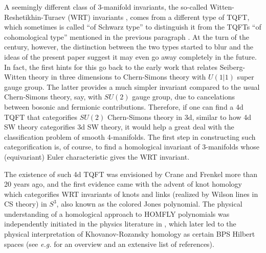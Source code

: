 \documentclass[hyper,letterpaper]{JHEP3}
\begin{document}
A seemingly different class of 3-manifold invariants, the so-called Witten-Reshetikhin-Turaev (WRT) invariants \cite{Witten:1988hf,MR1091619},
comes from a different type of TQFT, which sometimes is called ``of Schwarz type'' to distinguish it from
the TQFTs ``of cohomological type'' mentioned in the previous paragraph \cite{Birmingham:1991ty}.
At the turn of the century, however, the distinction between the two types started to blur and
the ideas of the present paper suggest it may even go away completely in the future.
In fact, the first hints for this go back to
the early work \cite{Rozansky:1992td,Chang:1991df,Rozansky:1992zt,meng1996sw}
that relates Seiberg-Witten theory in three dimensions to Chern-Simons theory with $U(1|1)$ super gauge group.
The latter provides a much simpler invariant compared to the usual Chern-Simons theory, say, with $SU(2)$ gauge group,
due to cancelations between bosonic and fermionic contributions.
Therefore, if one can find a 4d TQFT that categorifies $SU(2)$ Chern-Simons theory in 3d,
similar to how 4d SW theory categorifies 3d SW theory, it would help a great deal with the classification problem
of smooth 4-manifolds.
The first step in constructing such categorification is, of course,
to find a homological invariant of 3-manifolds whose (equivariant) Euler characteristic gives the WRT invariant.

The existence of such 4d TQFT was envisioned by Crane and Frenkel \cite{MR1295461} more than 20 years ago,
and the first evidence came with the advent of knot homology \cite{khovanov1999categorification,khovanov2008matrix,MR2901970}
which categorifies WRT invariants of knots and links (realized by Wilson lines in CS theory) in $S^3$, also known as the colored Jones polynomial.
The physical understanding of a homological approach to HOMFLY polynomials was independently initiated in the physics literature in \cite{Ooguri:1999bv}, which later led to the physical interpretation of Khovanov-Rozansky homology
as certain BPS Hilbert spaces \cite{Gukov:2004hz,Gukov:2007ck,Witten:2011zz,Aganagic:2011sg}
(see {\it e.g.} \cite{Chun:2015gda,Nawata:2015wya} for an overview and an extensive list of references).
\end{document}

